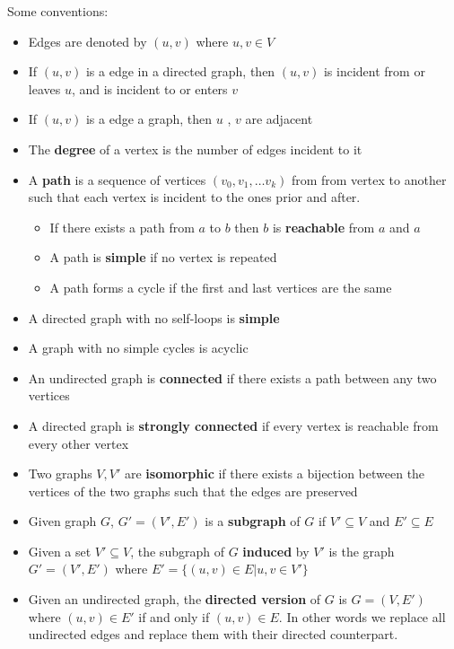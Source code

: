 \documentclass[../notes.tex]{subfiles}
\begin{document}
Some conventions:

\begin{itemize}
	\item Edges are denoted by $ (u,v) $ where $ u,v \in V $
	\item If $ (u,v)$ is a edge in a directed graph, then $ (u,v) $ is incident from or leaves $ u $, and is incident to or enters $ v $ 
	\item If $ (u,v) $ is a edge a graph, then $ u$ , $ v $ are adjacent
	\item The \textbf{degree} of a vertex is the number of edges incident to it
	\item A \textbf{path} is a sequence of vertices $ (v_0, v_1, \ldots v_k) $ from from vertex to another such that each vertex is incident to the ones prior and after.
		\begin{itemize}
			\item If there exists a path from $ a $  to $ b $ then $ b $ is \textbf{reachable} from $ a $ and $ a $
			\item A path is \textbf{simple}  if no vertex is repeated
			\item A path forms a cycle if the first and last vertices are the same
		\end{itemize}
	\item A directed graph with no self-loops is \textbf{simple} 
	\item A graph with no simple cycles is acyclic
	\item An undirected graph is \textbf{connected} if there exists a path between any two vertices
	\item A directed graph is \textbf{strongly connected} if every vertex is reachable from every other vertex
	\item Two graphs $ V, V' $  are \textbf{isomorphic} if there exists a bijection between the vertices of the two graphs such that the edges are preserved
	\item Given graph $ G $,  $ G' = (V', E') $ is a \textbf{subgraph}  of $ G $  if $ V' \subseteq V $ and $ E' \subseteq E $
	\item Given a set $ V' \subseteq V $, the subgraph of $ G $ \textbf{induced} by $ V' $ is the graph $ G' = (V', E') $ where $ E' = \{ (u,v) \in E | u,v \in V' \} $
	\item Given an undirected graph, the \textbf{directed version} of $ G $ is $ G = (V, E') $  where $ (u,v) \in E' $ if and only if $ (u,v) \in E $. In other words we replace all undirected edges and replace them with their directed counterpart.

\end{itemize}
\end{document}
